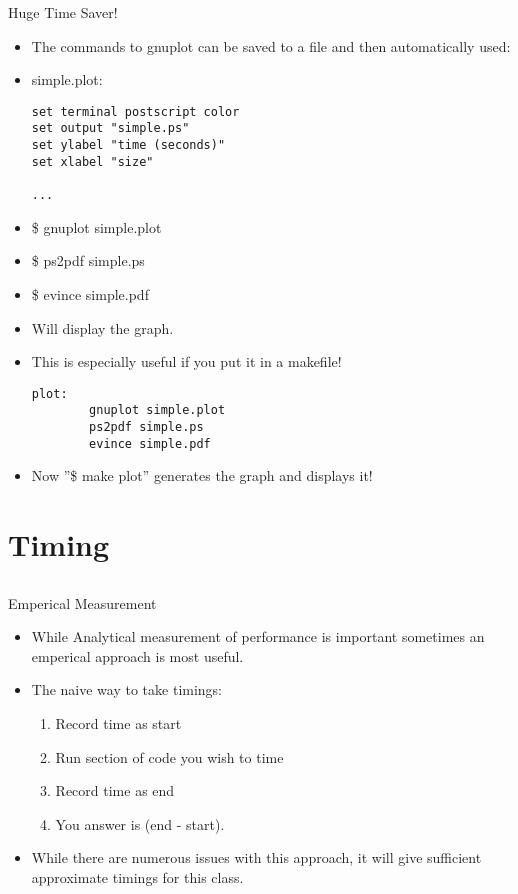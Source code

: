 \documentclass{beamer}
\begin{document}
\begin{frame}[fragile]{Huge Time Saver!}
\begin{itemize}
\item The commands to gnuplot can be saved to a file and then automatically used:
\item simple.plot:\\
\begin{lstlisting}
set terminal postscript color
set output "simple.ps"
set ylabel "time (seconds)"
set xlabel "size"

...
\end{lstlisting}
\item \$ gnuplot simple.plot
\item \$ ps2pdf simple.ps
\item \$ evince simple.pdf
\item Will display the graph.
\item This is especially useful if you put it in a makefile!
\begin{lstlisting}
plot:
        gnuplot simple.plot
        ps2pdf simple.ps
        evince simple.pdf
\end{lstlisting}
\item Now ''\$ make plot'' generates the graph and displays it!
\end{itemize}
\end{frame}

\section{Timing}
\subsection{}

\begin{frame}{Emperical Measurement}
\begin{itemize}
\item While Analytical measurement of performance is important sometimes an emperical approach is most useful.
\item The naive way to take timings:
\begin{enumerate}
\item Record time as start
\item Run section of code you wish to time
\item Record time as end
\item You answer is (end - start).
\end{enumerate}
\item While there are numerous issues with this approach, it will give sufficient approximate timings for this class.
\end{itemize}
\end{frame}
\end{document}
